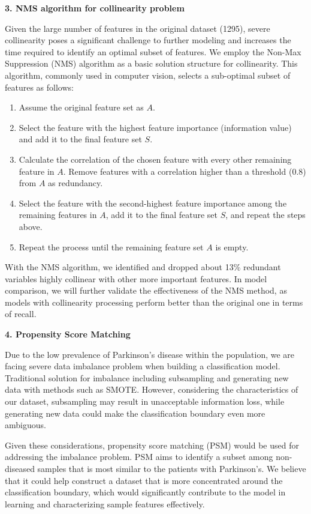 \documentclass[12pt,]{article}
\begin{document}
\begin{enumerate}
  \textbf{3. NMS algorithm for collinearity problem}

  Given the large number of features in the original dataset (1295),
  severe collinearity poses a significant challenge to further modeling
  and increases the time required to identify an optimal subset of
  features. We employ the Non-Max Suppression (NMS) algorithm as a basic
  solution structure for collinearity. This algorithm, commonly used in
  computer vision, selects a sub-optimal subset of features as follows:

  \begin{enumerate}
  \def\labelenumii{\arabic{enumii}.}
  \item
    Assume the original feature set as \(A\).
  \item
    Select the feature with the highest feature importance (information
    value) and add it to the final feature set \(S\).
  \item
    Calculate the correlation of the chosen feature with every other
    remaining feature in \(A\). Remove features with a correlation
    higher than a threshold (0.8) from \(A\) as redundancy.
  \item
    Select the feature with the second-highest feature importance among
    the remaining features in \(A\), add it to the final feature set
    \(S\), and repeat the steps above.
  \item
    Repeat the process until the remaining feature set \(A\) is empty.
  \end{enumerate}

  With the NMS algorithm, we identified and dropped about 13\% redundant
  variables highly collinear with other more important features. In
  model comparison, we will further validate the effectiveness of the
  NMS method, as models with collinearity processing perform better than
  the original one in terms of recall.

  \textbf{4. Propensity Score Matching}

  Due to the low prevalence of Parkinson's disease within the
  population, we are facing severe data imbalance problem when building
  a classification model. Traditional solution for imbalance including
  subsampling and generating new data with methods such as SMOTE.
  However, considering the characteristics of our dataset, subsampling
  may result in unacceptable information loss, while generating new data
  could make the classification boundary even more ambiguous.

  Given these considerations, propensity score matching (PSM) would be
  used for addressing the imbalance problem. PSM aims to identify a
  subset among non-diseased samples that is most similar to the patients
  with Parkinson's. We believe that it could help construct a dataset
  that is more concentrated around the classification boundary, which
  would significantly contribute to the model in learning and
  characterizing sample features effectively.


\end{enumerate}
\end{document}
